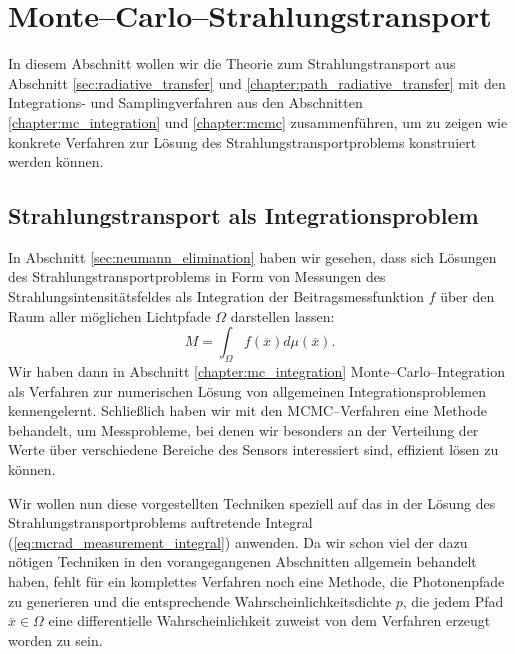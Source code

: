 	\chapter{Monte--Carlo--Strahlungstransport}\label{sec:mc_radiativetransfer}
	In diesem Abschnitt wollen wir die Theorie zum Strahlungstransport aus Abschnitt \ref{sec:radiative_transfer} und \ref{chapter:path_radiative_transfer} mit den Integrations- und Samplingverfahren aus den Abschnitten \ref{chapter:mc_integration} und \ref{chapter:mcmc} zusammenführen, um zu zeigen wie konkrete Verfahren zur Lösung des Strahlungstransportproblems konstruiert werden können.
	\section{Strahlungstransport als Integrationsproblem}
	In Abschnitt \ref{sec:neumann_elimination} haben wir gesehen, dass sich Lösungen des Strahlungstransportproblems in Form von Messungen des Strahlungsintensitätsfeldes als Integration der Beitragsmessfunktion $f$ über den Raum aller möglichen Lichtpfade $\Omega$ darstellen lassen:
	\begin{equation}
		M=\int_\Omega f({\overline x})d\mu({\overline x}).
		\label{eq:mcrad_measurement_integral}
	\end{equation}
	Wir haben dann in Abschnitt \ref{chapter:mc_integration} Monte--Carlo--Integration als Verfahren zur numerischen Lösung von allgemeinen Integrationsproblemen kennengelernt. Schließlich haben wir mit den MCMC--Verfahren eine Methode behandelt, um Messprobleme, bei denen wir besonders an der Verteilung der Werte über verschiedene Bereiche des Sensors interessiert sind, effizient lösen zu können.
	
	Wir wollen nun diese vorgestellten Techniken speziell auf das in der Lösung des Strahlungstransportproblems auftretende Integral (\ref{eq:mcrad_measurement_integral}) anwenden. Da wir schon viel der dazu nötigen Techniken in den vorangegangenen Abschnitten allgemein behandelt haben, fehlt für ein komplettes Verfahren noch eine Methode, die Photonenpfade zu generieren und die entsprechende Wahrscheinlichkeitsdichte $p$, die jedem Pfad ${\overline x}\in\Omega$ eine differentielle Wahrscheinlichkeit zuweist von dem Verfahren erzeugt worden zu sein.
	

